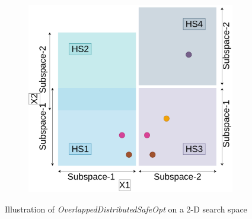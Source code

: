 \begin{figure}[H]
\begin{subfigure}{0.45\textwidth}
		\label{fig:ovr-dsbo-f}
	\end{subfigure}
	\begin{subfigure}{0.45\textwidth}
		\centering
		\includegraphics[scale=0.3]{figures/ovr-dbo/ovr-dbo-07.pdf}
		\caption{}
		\label{fig:ovr-dsbo-g}
	\end{subfigure}
	\caption{Illustration of \textit{OverlappedDistributedSafeOpt} on a 2-D search space}
	\label{fig:ovr-dsbo}
\end{figure}